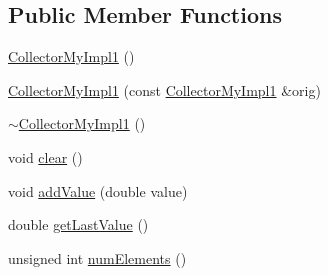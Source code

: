 \subsection*{Public Member Functions}
\begin{DoxyCompactItemize}
\item 
\hyperlink{class_collector_my_impl1_ab8d5d86d5d28f0cc3a4558fe5a6da56c}{Collector\-My\-Impl1} ()
\item 
\hyperlink{class_collector_my_impl1_a7d96fa7024ff2e2158613c4b55ea052f}{Collector\-My\-Impl1} (const \hyperlink{class_collector_my_impl1}{Collector\-My\-Impl1} \&orig)
\item 
\hyperlink{class_collector_my_impl1_a431e418b9b2cf55e6fb10ba688ae281e}{$\sim$\-Collector\-My\-Impl1} ()
\item 
void \hyperlink{class_collector_my_impl1_a9b570931955cafde878d6734aa914039}{clear} ()
\item 
void \hyperlink{class_collector_my_impl1_acc5d658a3429af8b7d4265cbc37485b5}{add\-Value} (double value)
\item 
double \hyperlink{class_collector_my_impl1_a56e754ba3175e2f335290e2a737e7104}{get\-Last\-Value} ()
\item 
unsigned int \hyperlink{class_collector_my_impl1_ac71aac361d3c9a5d0c9cc76c1c75e47e}{num\-Elements} ()
\end{DoxyCompactItemize}


